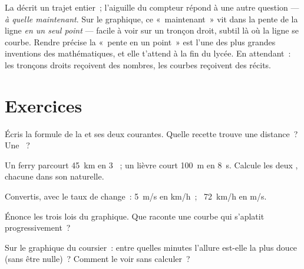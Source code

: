 \begin{remark}\label{rem:g7:motion-average-speed:speedometer}
La  décrit un trajet entier~; l'aiguille du compteur
répond à une autre question --- \emph{à quelle  maintenant}.
Sur le graphique, ce «~maintenant~» vit dans la pente de la ligne
\emph{en un seul point} --- facile à voir sur un tronçon droit,
subtil là où la ligne se courbe. Rendre précise la «~pente en un
point~» est l'une des plus grandes inventions des mathématiques, et
elle t'attend à la fin du lycée. En attendant~: les tronçons droits
reçoivent des nombres, les courbes reçoivent des récits.
\end{remark}

\section{Exercices}

\begin{exercise}[$\star$]\label{exo:g7:motion-average-speed:1}
Écris la formule de la  et ses deux  courantes. Quelle
recette trouve une distance~? Une ~?
\end{exercise}

\begin{exercise}[$\star$]\label{exo:g7:motion-average-speed:2}
Un ferry parcourt \qty{45}{km} en $3$ ~; un lièvre court
\qty{100}{m} en \qty{8}{s}. Calcule les deux , chacune dans
son  naturelle.
\end{exercise}

\begin{exercise}[$\star$]\label{exo:g7:motion-average-speed:3}
Convertis, avec le taux de change~: \qty{5}{m/s} en \unit{km/h}~; \
\qty{72}{km/h} en \unit{m/s}.
\end{exercise}

\begin{exercise}[$\star$]\label{exo:g7:motion-average-speed:4}
Énonce les trois lois du graphique. Que raconte une courbe qui
s'aplatit progressivement~?
\end{exercise}

\begin{exercise}[$\star$]\label{exo:g7:motion-average-speed:5}
Sur le graphique du coursier~: entre quelles minutes l'allure
est-elle la plus douce (sans être nulle)~? Comment le voir sans
calculer~?
\end{exercise}

